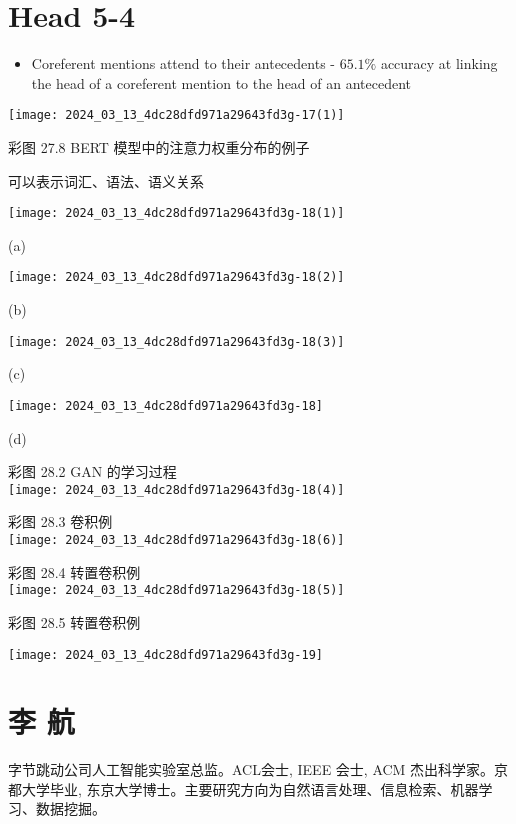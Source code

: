 \documentclass[10pt]{article}
\begin{document}
\section*{Head 5-4}
\begin{itemize}
  \item Coreferent mentions attend to their antecedents - $65.1 \%$ accuracy at linking the head of a coreferent mention to the head of an antecedent
\end{itemize}

\begin{center}
\texttt{[image: 2024\_03\_13\_4dc28dfd971a29643fd3g-17(1)]}
\end{center}

彩图 27.8 BERT 模型中的注意力权重分布的例子

可以表示词汇、语法、语义关系

\begin{center}
\texttt{[image: 2024\_03\_13\_4dc28dfd971a29643fd3g-18(1)]}
\end{center}

(a)

\begin{center}
\texttt{[image: 2024\_03\_13\_4dc28dfd971a29643fd3g-18(2)]}
\end{center}

(b)

\begin{center}
\texttt{[image: 2024\_03\_13\_4dc28dfd971a29643fd3g-18(3)]}
\end{center}

(c)

\begin{center}
\texttt{[image: 2024\_03\_13\_4dc28dfd971a29643fd3g-18]}
\end{center}

(d)

彩图 28.2 GAN 的学习过程\\
\texttt{[image: 2024\_03\_13\_4dc28dfd971a29643fd3g-18(4)]}

彩图 28.3 卷积例\\
\texttt{[image: 2024\_03\_13\_4dc28dfd971a29643fd3g-18(6)]}

彩图 28.4 转置卷积例\\
\texttt{[image: 2024\_03\_13\_4dc28dfd971a29643fd3g-18(5)]}

彩图 28.5 转置卷积例

\begin{center}
\texttt{[image: 2024\_03\_13\_4dc28dfd971a29643fd3g-19]}
\end{center}

\section*{李 航}
字节跳动公司人工智能实验室总监。ACL会士, IEEE 会士, ACM 杰出科学家。京都大学毕业, 东京大学博士。主要研究方向为自然语言处理、信息检索、机器学习、数据挖掘。
\end{document}
